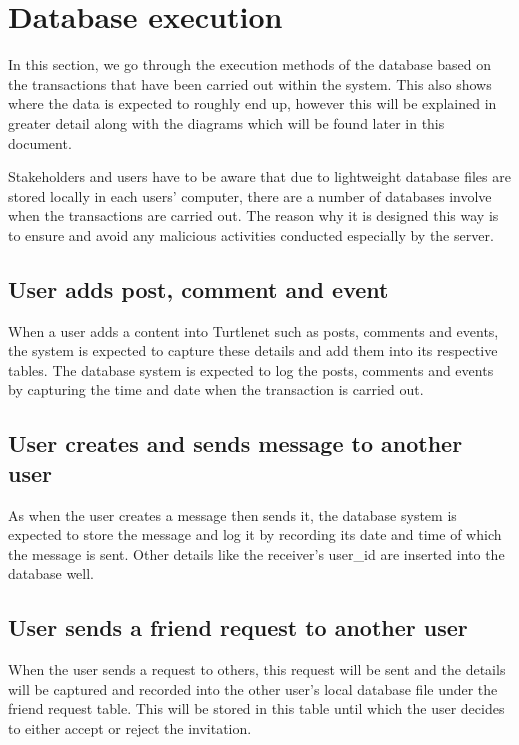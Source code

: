 
\section{Database execution }
In this section, we go through the execution methods of the database based on 
the transactions that have been carried out within the system. This also shows 
where the data is expected to roughly end up, however this will be explained in 
greater detail along with the diagrams which will be found later in this 
document.

Stakeholders and users have to be aware that due to lightweight database files 
are stored locally in each users' computer, there are a number of databases 
involve when the transactions are carried out. The reason why it is designed 
this way is to ensure and avoid any malicious activities conducted especially 
by the server. 

\subsection{User adds post, comment and event}
When a user adds a content into Turtlenet such as posts, comments and events, 
the system is expected to capture these details and add them into its 
respective tables. The database system is expected to log the posts, comments 
and events by capturing the time and date when the transaction is carried out.

\subsection{User creates and sends message to another user}
As when the user creates a message then sends it, the database system is 
expected to store the message and log it by recording its date and time of 
which the message is sent. Other details like the receiver's user\_id are 
inserted into the database well.

\subsection{User sends a friend request to another user}
When the user sends a request to others, this request will be sent and the 
details will be captured and recorded into the other user's local database 
file under the friend request table. This will be stored in this table until 
which the user decides to either accept or reject the invitation.

